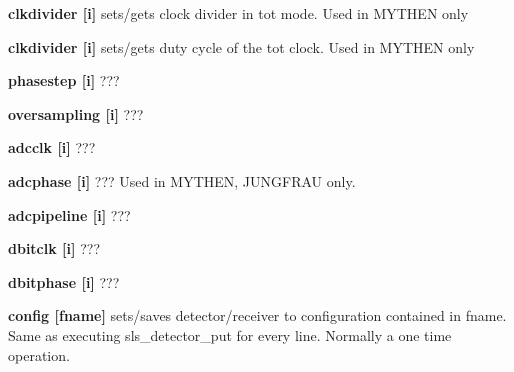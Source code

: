 \begin{DoxyItemize}
\item {\bfseries clkdivider \mbox{[}i\mbox{]}} sets/gets clock divider in tot mode. Used in MYTHEN only
\end{DoxyItemize}


\begin{DoxyItemize}
\item {\bfseries clkdivider \mbox{[}i\mbox{]}} sets/gets duty cycle of the tot clock. Used in MYTHEN only
\end{DoxyItemize}


\begin{DoxyItemize}
\item {\bfseries phasestep \mbox{[}i\mbox{]}} ???
\end{DoxyItemize}


\begin{DoxyItemize}
\item {\bfseries oversampling \mbox{[}i\mbox{]}} ???
\end{DoxyItemize}


\begin{DoxyItemize}
\item {\bfseries adcclk \mbox{[}i\mbox{]}} ???
\end{DoxyItemize}


\begin{DoxyItemize}
\item {\bfseries adcphase \mbox{[}i\mbox{]}} ??? Used in MYTHEN, JUNGFRAU only.
\end{DoxyItemize}


\begin{DoxyItemize}
\item {\bfseries adcpipeline \mbox{[}i\mbox{]}} ???
\end{DoxyItemize}


\begin{DoxyItemize}
\item {\bfseries dbitclk \mbox{[}i\mbox{]}} ???
\end{DoxyItemize}


\begin{DoxyItemize}
\item {\bfseries dbitphase \mbox{[}i\mbox{]}} ???
\end{DoxyItemize}


\begin{DoxyItemize}
\item {\bfseries config \mbox{[}fname\mbox{]}} sets/saves detector/receiver to configuration contained in fname. Same as executing sls\_\-detector\_\-put for every line. Normally a one time operation.
\end{DoxyItemize}


